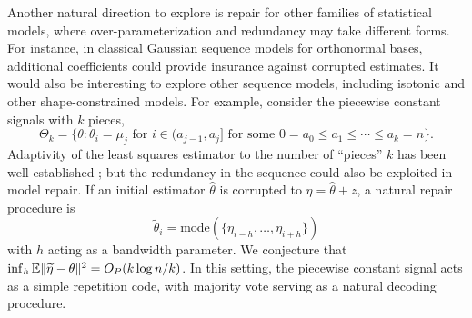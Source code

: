 Another natural direction to explore is repair for other families of statistical models, where over-parameterization and redundancy may take different forms. For instance, in classical Gaussian sequence models for orthonormal bases, additional coefficients could provide insurance against corrupted estimates.
It would also be interesting
to explore other sequence models, including isotonic and other shape-constrained models. For example, consider the piecewise constant signals with $k$ pieces,
$$\Theta_k  = \{\theta : \mbox{$\theta_i = \mu_j$ for $i\in (a_{j-1}, a_j]$ for
some $0=a_0 \leq a_1\leq \cdots \leq a_k=n$}\}.$$
Adaptivity of the least squares estimator to the number of ``pieces'' $k$  has been well-established
\citep{chatterjee2015risk,Chat14,bellec}; but
the redundancy in the sequence could also be exploited in model repair. If an initial estimator $\hat \theta$ is
corrupted to $\eta = \hat\theta + z$, a natural repair procedure is
$$\tilde \theta_i = \text{mode}(\{\eta_{i-h},\ldots,\eta_{i+h}\})$$
with $h$ acting as a bandwidth parameter. We conjecture that
$\inf_h \mathbb{E}\|\widetilde\eta -\theta\|^2 = O_P(k \log n/k)$. In this setting,
the piecewise constant signal acts as a simple repetition code, with majority vote
serving as a natural decoding procedure.


